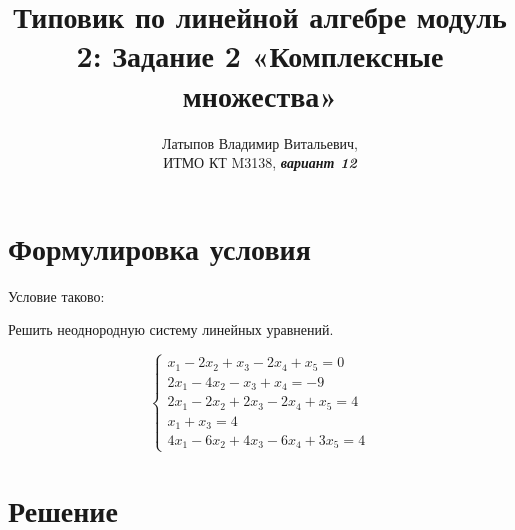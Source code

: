 \documentclass[12pt, a4paper]{article}
\author{Латыпов Владимир Витальевич, \\ ИТМО КТ M3138, \Huge{\textit{\textbf{вариант 12}}}}
\title{Типовик по линейной алгебре модуль 2: Задание 2 «Комплексные множества»}
\begin{document}
    \tittoc

    \section{Формулировка условия}

    \begin{statement}
        Условие таково: 
        
        Решить неоднородную систему линейных уравнений.

        \begin{equation}
            \begin{cases}
                x_1 − 2x_2 + x_3 − 2x_4 + x_5 = 0 \\
                2x_1 − 4x_2 − x_3 + x_4 = −9 \\
                2x_1 − 2x_2 + 2x_3 − 2x_4 + x_5 = 4 \\
                x_1 + x_3 = 4 \\
                4x_1 − 6x_2 + 4x_3 − 6x_4 + 3x_5 = 4
            \end{cases}
        \end{equation}
            
    \end{statement}

    \section{Решение}
\end{document}
